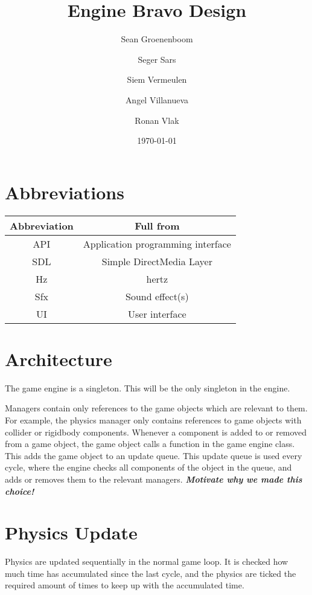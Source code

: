 \documentclass{article}
\title{Engine Bravo Design}
\author{Sean Groenenboom \and Seger Sars \and Siem Vermeulen \and Angel Villanueva \and Ronan Vlak} %
\date{\today}
\begin{document}
\maketitle %
\newpage

\tableofcontents
\newpage

\section{Abbreviations}
\begin{tabular}{c|c}
  \textbf{Abbreviation} & \textbf{Full from} \\ \hline
  API & Application programming interface \\ \hline
  SDL & Simple DirectMedia Layer \\ \hline
  Hz & hertz \\ \hline
  Sfx & Sound effect(s) \\ \hline
  UI & User interface \\
\end{tabular}

\section{Architecture}
The game engine is a singleton. This will be the only singleton in the engine.

Managers contain only references to the game objects which are relevant to them. For example, the physics manager only contains references to game objects with collider or rigidbody components.
Whenever a component is added to or removed from a game object, the game object calls a function in the game engine class. This adds the game object to an update queue. This update queue is used every cycle, where the engine checks all components of the object in the queue, and adds or removes them to the relevant managers.
\textbf{\textit{Motivate why we made this choice!}}

\section{Physics Update}
Physics are updated sequentially in the normal game loop. It is checked how much time has accumulated since the last cycle, and the physics are ticked the required amount of times to keep up with the accumulated time.
\end{document}
